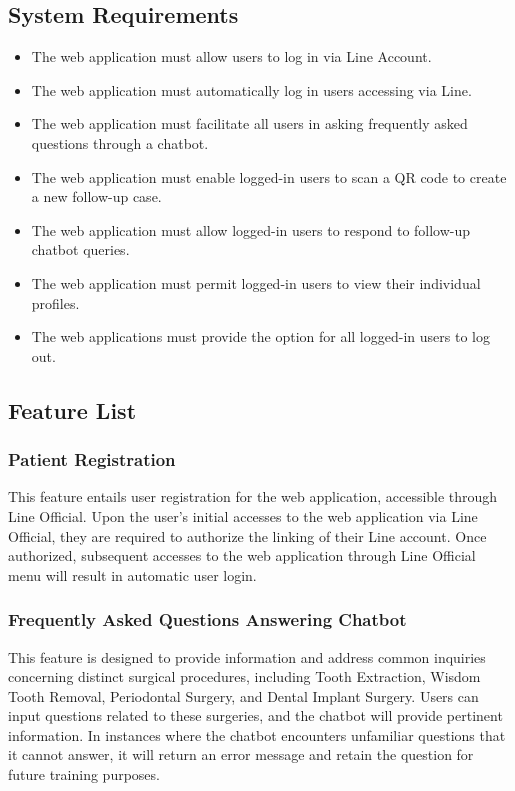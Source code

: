 \documentclass[12pt,oneside,openright,a4paper]{cpe-english-project}
\begin{document}
    \subsection{System Requirements}
    \begin{itemize}
      \item The web application must allow users to log in via Line Account.
      \item The web application must automatically log in users accessing via Line.
      \item The web application must facilitate all users in asking frequently asked questions through a chatbot.
      \item The web application must enable logged-in users to scan a QR code to create a new follow-up case.
      \item The web application must allow logged-in users to respond to follow-up chatbot queries.
      \item The web application must permit logged-in users to view their individual profiles.
      \item The web applications must provide the option for all logged-in users to log out.
    \end{itemize}

    \subsection{Feature List}
      \subsubsection{Patient Registration}
      \qquad This feature entails user registration for the web application, accessible through Line Official. Upon the user’s initial accesses to the web application via Line Official, they are required to authorize the linking of their Line account. Once authorized, subsequent accesses to the web application through Line Official menu will result in automatic user login. \par
      \subsubsection{Frequently Asked Questions Answering Chatbot}
      \qquad This feature is designed to provide information and address common inquiries concerning distinct surgical procedures, including Tooth Extraction, Wisdom Tooth Removal, Periodontal Surgery, and Dental Implant Surgery. Users can input questions related to these surgeries, and the chatbot will provide pertinent information. In instances where the chatbot encounters unfamiliar questions that it cannot answer, it will return an error message and retain the question for future training purposes. \par
\end{document}
